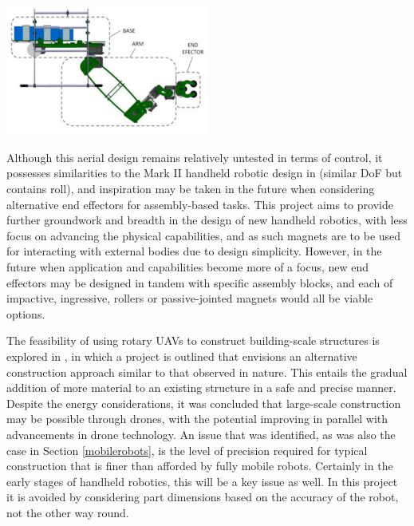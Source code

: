 \documentclass[11pt]{article}
\begin{document}
\begin{center}
\includegraphics[width = 0.5\textwidth]{uavmanipulator.png}
\label{figure:uavmanipulator}
\end{center}

Although this aerial design remains relatively untested in terms of control, it possesses similarities to the Mark II handheld robotic design in \cite{GreggSmithKinematics} (similar DoF but contains roll), and inspiration may be taken in the future when considering alternative end effectors for assembly-based tasks. This project aims to provide further groundwork and breadth in the design of new handheld robotics, with less focus on advancing the physical capabilities, and as such magnets are to be used for interacting with external bodies due to design simplicity. However, in the future when application and capabilities become more of a focus, new end effectors may be designed in tandem with specific assembly blocks, and each of impactive, ingressive, rollers or passive-jointed magnets would all be viable options.


The feasibility of using rotary UAVs to construct building-scale structures is explored in \cite{latteur2015}, in which a project is outlined that envisions an alternative construction approach similar to that observed in nature. This entails the gradual addition of more material to an existing structure in a safe and precise manner. Despite the energy considerations, it was concluded that large-scale construction may be possible through drones, with the potential improving in parallel with advancements in drone technology. An issue that was identified, as was also the case in Section \ref{mobilerobots}, is the level of precision required for typical construction that is finer than afforded by fully mobile robots. Certainly in the early stages of handheld robotics, this will be a key issue as well. In this project it is avoided by considering part dimensions based on the accuracy of the robot, not the other way round. 
\end{document}
